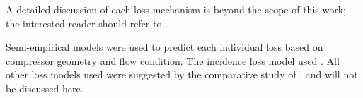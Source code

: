 \documentclass[tcc]{subfiles}
\begin{document}
A detailed discussion of each loss mechanism is beyond the scope of this work; 
the interested reader should refer to \textcite{Cumpsty2004}. 

Semi-empirical models were used to predict each individual loss 
based on compressor geometry and flow condition. 
The incidence loss model used \textcite{Stanitz1953}.
All other loss models used were suggested by the comparative study of \textcite{Oh1997}, 
and will not be discussed here.
\end{document}
